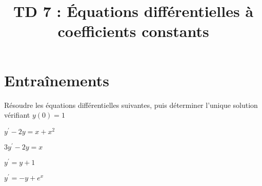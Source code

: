 \documentclass[a4paper, 11pt,reqno]{article}
\newcommand{\type}{TD }
\begin{document}
\title{\type 7 : Équations différentielles à coefficients constants}


\section*{Entraînements}

\begin{exercice}  \;
  R\'esoudre les \'equations diff\'erentielles suivantes, puis déterminer l'unique solution vérifiant $y(0)=1$
  \begin{enumerate}
    \begin{minipage}[c]{0.45\linewidth}
      \item $y^{\prime}-2y=x+x^2$
      \item$3y^{\prime}-2y=x$

    \end{minipage}
    \begin{minipage}[c]{0.45\linewidth}
      \item $y^{\prime}=y +1$
      \item $y^{\prime}=-y+e^x$
    \end{minipage}
  \end{enumerate}
\end{exercice}
\end{document}
